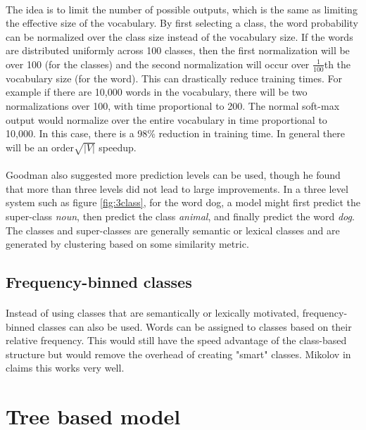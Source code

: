 \paragraph{}
The idea is to limit the number of possible outputs, which is the same as limiting the effective size of the vocabulary. By first selecting a class, the word probability can be normalized over the class size instead of the vocabulary size. If the words are distributed uniformly across 100 classes, then the first normalization will be over 100 (for the classes) and the second normalization will occur over $\frac{1}{100}$th the vocabulary size (for the word). This can drastically reduce training times. For example if there are 10,000 words in the vocabulary, there will be two normalizations over 100, with time proportional to 200. The normal soft-max output would normalize over the entire vocabulary in time proportional to 10,000. In this case, there is a 98\% reduction in training time. In general there will be an order$\sqrt{|V|}$ speedup.
\paragraph{}
Goodman also suggested more prediction levels can be used, though he found that more than three levels did not lead to large improvements. In a three level system such as figure \ref{fig:3class}, for the word dog, a model might first predict the super-class \emph{noun}, then predict the class \emph{animal}, and finally predict the word \emph{dog}. The classes and super-classes are generally semantic or lexical classes and are generated by clustering based on some similarity metric.
\subsection{Frequency-binned classes}
\paragraph{}
Instead of using classes that are semantically or lexically motivated, frequency-binned classes can also be used. Words can be assigned to classes based on their relative frequency. This would still have the speed advantage of the class-based structure but would remove the overhead of creating "smart" classes. Mikolov in \cite{Mikolov2012} claims this works very well. 

\section{Tree based model}
